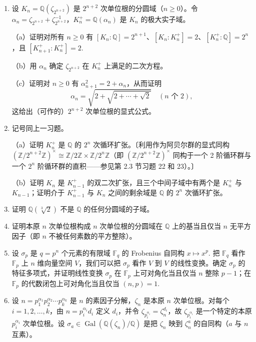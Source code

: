\begin{enumerate}
\item 设 \(K_n = \mathbb{Q}(\zeta_{2^{n+2}})\) 是 \(2^{n+2}\) 次单位根的分圆域（\(n \geq 0\)）。令 \(\alpha_n = \zeta_{2^{n+2}}+\zeta_{2^{n+2}}^{-1}\)，\(K_n^+ = \mathbb{Q}(\alpha_n)\) 是 \(K_n\) 的极大实子域。

（a）证明对所有 \(n \geq 0\) 有 \([K_n:\mathbb{Q}] = 2^{n+1}\)、\([K_n:K_n^+] = 2\)、\([K_n^+:\mathbb{Q}] = 2^n\)，且 \([K_{n+1}^+:K_n^+] = 2\).

（b）用 \(\alpha_n\) 确定 \(\zeta_{2^{n+2}}\) 在 \(K_n^+\) 上满足的二次方程。

（c）证明对 \(n \geq 0\) 有 \(\alpha_{n+1}^2 = 2+\alpha_n\)，从而证明
\[
\alpha_n = \sqrt{2+\sqrt{2+\cdots+\sqrt{2}}} \quad (n \text{ 个 } 2),
\]
这给出（可作的）\(2^{n+2}\) 次单位根的显式公式。

\item 记号同上一习题。

（a）证明 \(K_n^+\) 是 \(\mathbb{Q}\) 的 \(2^n\) 次循环扩张。〔利用作为阿贝尔群的显式同构 \((\mathbb{Z}/2^{n+2}\mathbb{Z})^\times \cong \mathbb{Z}/2\mathbb{Z} \times \mathbb{Z}/2^n\mathbb{Z}\)（即 \((\mathbb{Z}/2^{n+2}\mathbb{Z})^\times\) 同构于一个 2 阶循环群与一个 \(2^n\) 阶循环群的直积——参见第 2.3 节习题 22 和 23）。〕

（b）证明 \(K_n\) 是 \(K_{n-1}^+\) 的双二次扩张，且三个中间子域中有两个是 \(K_n^+\) 与 \(K_{n-1}\)；证明介于 \(K_{n-1}^+\) 与 \(K_n\) 之间的剩余域是 \(\mathbb{Q}\) 的 \(2^n\) 次循环扩张。

\item 证明 \(\mathbb{Q}(\sqrt[3]{2})\) 不是 \(\mathbb{Q}\) 的任何分圆域的子域。

\item 证明本原 \(n\) 次单位根构成 \(n\) 次单位根的分圆域在 \(\mathbb{Q}\) 上的基当且仅当 \(n\) 无平方因子（即 \(n\) 不被任何素数的平方整除）。

\item 设 \(\sigma_p\) 是 \(q = p^n\) 个元素的有限域 \(\mathbb{F}_q\) 的 Frobenius 自同构 \(x \mapsto x^p\). 把 \(\mathbb{F}_q\) 看作 \(\mathbb{F}_p\) 上 \(n\) 维向量空间 \(V\)，我们可以把 \(\sigma_p\) 看作 \(V\) 到 \(V\) 的线性变换。确定 \(\sigma_p\) 的特征多项式，并证明线性变换 \(\sigma_p\) 在 \(\mathbb{F}_p\) 上可对角化当且仅当 \(n\) 整除 \(p-1\)；在 \(\mathbb{F}_p\) 的代数闭包上可对角化当且仅当 \((n, p) = 1\).

\item 设 \(n = p_1^{\alpha_1}p_2^{\alpha_2}\cdots p_k^{\alpha_k}\) 是 \(n\) 的素因子分解，\(\zeta_n\) 是本原 \(n\) 次单位根。对每个 \(i = 1, 2, \ldots, k\)，由 \(n = p_i^{\alpha_i}d_i\) 定义 \(d_i\)，并令 \(\zeta_{p_i^{\alpha_i}} = \zeta_n^{d_i}\)，故 \(\zeta_{p_i^{\alpha_i}}\) 是一个特定的本原 \(p_i^{\alpha_i}\) 次单位根。设 \(\sigma_a \in \operatorname{Gal}(\mathbb{Q}(\zeta_n)/\mathbb{Q})\) 是把 \(\zeta_n\) 映到 \(\zeta_n^a\) 的自同构（\(a\) 与 \(n\) 互素）。


\end{enumerate}
